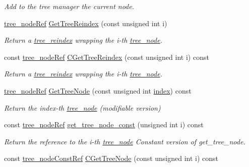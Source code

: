 \begin{DoxyCompactItemize}
\begin{DoxyCompactList}\small\item\em Add to the tree manager the current node. \end{DoxyCompactList}\item 
\hyperlink{tree__node_8hpp_a6ee377554d1c4871ad66a337eaa67fd5}{tree\+\_\+node\+Ref} \hyperlink{classtree__manager_ab73b98908338fff37cdc84891befd090}{Get\+Tree\+Reindex} (const unsigned int i)
\begin{DoxyCompactList}\small\item\em Return a \hyperlink{classtree__reindex}{tree\+\_\+reindex} wrapping the i-\/th \hyperlink{classtree__node}{tree\+\_\+node}. \end{DoxyCompactList}\item 
const \hyperlink{tree__node_8hpp_a6ee377554d1c4871ad66a337eaa67fd5}{tree\+\_\+node\+Ref} \hyperlink{classtree__manager_a845dc23e54477b4c7dac3c874619ff60}{C\+Get\+Tree\+Reindex} (const unsigned int i) const
\begin{DoxyCompactList}\small\item\em Return a \hyperlink{classtree__reindex}{tree\+\_\+reindex} wrapping the i-\/th \hyperlink{classtree__node}{tree\+\_\+node}. \end{DoxyCompactList}\item 
\hyperlink{tree__node_8hpp_a6ee377554d1c4871ad66a337eaa67fd5}{tree\+\_\+node\+Ref} \hyperlink{classtree__manager_af4c6e92e486ed94a05c42a36e0825425}{Get\+Tree\+Node} (const unsigned int \hyperlink{tutorial__pact__2019_2Introduction_2third_2include_2Keccak_8h_a028c9bdc8344cca38ab522a337074797}{index}) const
\begin{DoxyCompactList}\small\item\em Return the index-\/th \hyperlink{classtree__node}{tree\+\_\+node} (modifiable version) \end{DoxyCompactList}\item 
const \hyperlink{tree__node_8hpp_a6ee377554d1c4871ad66a337eaa67fd5}{tree\+\_\+node\+Ref} \hyperlink{classtree__manager_aabae1e5f92b152ef3e8d8134b8cbf955}{get\+\_\+tree\+\_\+node\+\_\+const} (unsigned int i) const
\begin{DoxyCompactList}\small\item\em Return the reference to the i-\/th \hyperlink{classtree__node}{tree\+\_\+node} Constant version of get\+\_\+tree\+\_\+node. \end{DoxyCompactList}\item 
const \hyperlink{tree__node_8hpp_a3cf5d02292c940f3892425a5b5fdec3c}{tree\+\_\+node\+Const\+Ref} \hyperlink{classtree__manager_a3be40fa69b053f44152021be01496bc0}{C\+Get\+Tree\+Node} (const unsigned int i) const

\end{DoxyCompactItemize}
